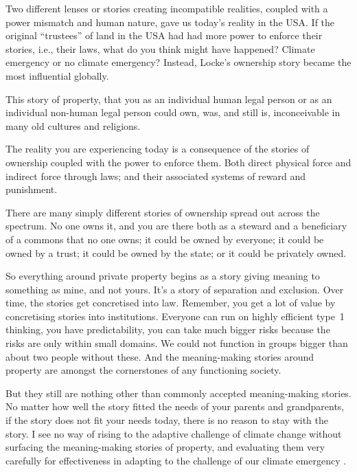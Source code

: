 Two different lenses or stories creating incompatible realities, coupled with a power mismatch and human nature, gave us today's reality in the USA. If the original “trustees” of land in the USA had had more power to enforce their stories, i.e., their laws, what do you think might have happened? Climate emergency  or no climate emergency? Instead, Locke's ownership story became the most influential globally.


This story of property, that you as an individual human legal person or as an individual non-human legal person could own, was, and still is, inconceivable in many old cultures and religions.


The reality you are experiencing today is a consequence of the stories of ownership coupled with the power to enforce them. Both direct physical force and indirect force through laws; and their associated systems of reward and punishment\cite{vant-institutions}. 


There are many simply different stories of ownership\cite{vant-institutions} spread out across the spectrum. No one owns it, and you are there both as a steward and a beneficiary of a commons that no one owns; it could be owned by everyone; it could be owned by a trust; it could be owned by the state; or it could be privately owned.


So everything around private property begins as a story giving meaning to something as mine, and not yours. It's a story of separation and exclusion. Over time, the stories get concretised into law. Remember, you get a lot of value by concretising stories into institutions. Everyone can run on highly efficient type~1 thinking, you have predictability, you can take much bigger risks because the risks are only within small domains. We could not function in groups bigger than about two people without these. And the meaning\hyp{}making stories around property are amongst the cornerstones of any functioning society. 


But they still are nothing other than commonly accepted meaning\hyp{}making stories. No matter how well the story fitted the needs of your parents and grandparents, if the story does not fit your needs today, there is no reason to stay with the story. I see no way of rising to the adaptive challenge of climate change without surfacing the meaning\hyp{}making stories of property, and evaluating them very carefully for effectiveness in adapting to the challenge of our climate emergency .






